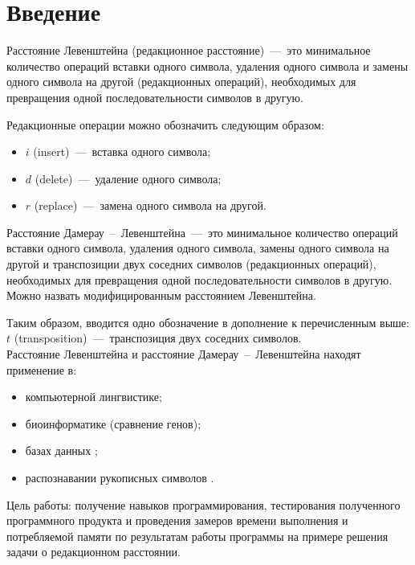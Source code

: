 \setcounter{page}{3}
\chapter*{Введение}

Расстояние Левенштейна (редакционное расстояние)~---~это минимальное количество операций вставки одного символа, удаления одного символа и замены одного символа на другой (редакционных операций), необходимых для превращения одной последовательности символов в другую.

Редакционные операции можно обозначить следующим образом:
\begin{itemize}
	\item $i$ (insert)~---~вставка одного символа;
	\item $d$ (delete)~---~удаление одного символа;
	\item $r$ (replace)~---~замена одного символа на другой.
\end{itemize}

Расстояние Дамерау~--~Левенштейна~---~это минимальное количество операций вставки одного символа, удаления одного символа, замены одного символа на другой и транспозиции двух соседних символов (редакционных операций), необходимых для превращения одной последовательности символов в другую. Можно назвать модифицированным расстоянием Левенштейна.

Таким образом, вводится одно обозначение в дополнение к перечисленным выше: \\
$t$ (transposition)~---~транспозиция двух соседних символов.\\

Расстояние Левенштейна и расстояние Дамерау~--~Левенштейна находят применение в:
\begin{itemize}
	\item компьютерной лингвистике;
	\item биоинформатике (сравнение генов);
	\item базах данных \cite{web_item1};
	\item распознавании рукописных символов \cite{web_item1}.
\end{itemize}

\newpage

Цель работы: получение навыков программирования, тестирования полученного программного продукта и проведения замеров времени выполнения и потребляемой памяти по результатам работы программы на примере решения задачи о редакционном расстоянии.\\

